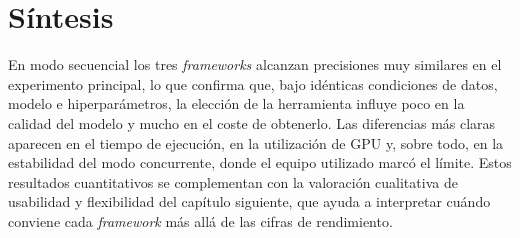 \section{Síntesis}\label{sec:sintesis-resultados}

En modo secuencial los tres \textit{frameworks} alcanzan precisiones muy similares en el
experimento principal, lo que confirma que, bajo idénticas condiciones de datos, modelo e
hiperparámetros, la elección de la herramienta influye poco en la calidad del modelo y mucho en
el coste de obtenerlo. Las diferencias más claras aparecen en el tiempo de ejecución, en la
utilización de GPU y, sobre todo, en la estabilidad del modo concurrente, donde el equipo
utilizado marcó el límite. Estos resultados cuantitativos se complementan con la valoración
cualitativa de usabilidad y flexibilidad del capítulo siguiente, que ayuda a interpretar cuándo
conviene cada \textit{framework} más allá de las cifras de rendimiento.
